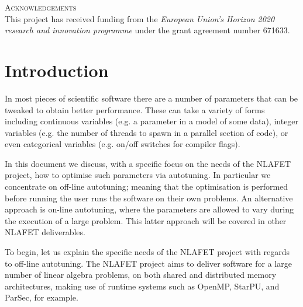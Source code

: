 \documentclass[a4paper,12pt]{article}
\begin{document}
\noindent
\textsc{Acknowledgements}\\[1em]
This project has received funding from the \emph{European Union's Horizon 2020 research and innovation programme} under the grant agreement number 671633.





%

\newpage

\renewcommand{\contentsname}{Table of Contents}
\tableofcontents

\listoffigures



\newpage

%

\section{Introduction}
\label{sec.introduction}
In most pieces of scientific software there are a number of
parameters that can be tweaked to obtain better performance.
These can take a variety of forms including
continuous variables (e.g. a parameter in a model of some data),
integer variables (e.g. the number of threads to spawn in a
parallel section of code),
or even categorical variables (e.g. on/off switches for compiler flags).

In this document we discuss,
with a specific focus on the needs of the NLAFET project,
how to optimise such parameters via autotuning.
In particular we concentrate on off-line autotuning;
meaning that the optimisation is performed before running the
user runs the software on their own problems.
An alternative approach is on-line autotuning,
where the parameters are allowed to vary during the execution
of a large problem.
This latter approach will be covered in other NLAFET deliverables.

To begin,
let us explain the specific needs of the NLAFET project
with regards to off-line autotuning.
The NLAFET project aims to deliver software for a large number of
linear algebra problems,
on both shared and distributed memory architectures,
making use of runtime systems such as OpenMP, StarPU, and ParSec,
for example.
\end{document}
